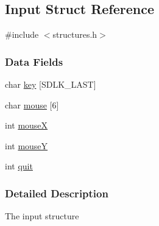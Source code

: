 \hypertarget{struct_input}{\subsection{Input Struct Reference}
\label{struct_input}
}


{\ttfamily \#include $<$structures.\-h$>$}

\subsubsection*{Data Fields}
\begin{DoxyCompactItemize}
\item 
char \hyperlink{struct_input_afc4eabd057bd0061b56de4005f5ecbb8}{key} \mbox{[}S\-D\-L\-K\-\_\-\-L\-A\-S\-T\mbox{]}
\item 
char \hyperlink{struct_input_abdf8b0b51bc72dab0a8b2c2b550620d9}{mouse} \mbox{[}6\mbox{]}
\item 
int \hyperlink{struct_input_a85ea1b63086b31a15d3ed2579c5715a6}{mouse\-X}
\item 
int \hyperlink{struct_input_a3637abebcaa9d04aa18b1610d0921e16}{mouse\-Y}
\item 
int \hyperlink{struct_input_a2896431d6a80cd39b3d24b40237612ee}{quit}
\end{DoxyCompactItemize}


\subsubsection{Detailed Description}
The input structure 

